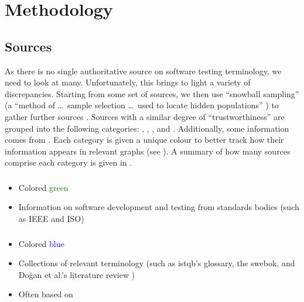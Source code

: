 \section{Methodology}
\label{methodology}

\subsection{Sources}
\label{sources}
As there is no single authoritative source on software testing terminology,
we need to look at many. Unfortunately, this brings to light a variety of
discrepancies. Starting from some set of sources, we then use
``snowball sampling'' (a ``method of \dots\ sample selection \dots\ used to
locate hidden populations'' \citep{Johnson2014}) to gather further sources%
. Sources with a similar degree of
``trustworthiness'' are grouped into the following
categories: \stds{}, \metas{}, \texts{}, and \others{}. \ifnotpaper
    Additionally, some information comes from . \fi Each category is
given a unique colour to better track how their information appears in relevant
graphs (see ). A summary
of how many sources comprise each category is given in .

\subsubsection{}
\label{stds}
\begin{itemize}
    \item Colored \textcolor{green}{green}
    \item Information on software development and testing from
          standards bodies \ifnotpaper\else (such as IEEE and ISO)\fi
\end{itemize}

\subsubsection{}
\label{metas}
\begin{itemize}
    \item Colored \textcolor{blue}{blue}
    \item Collections of relevant terminology (such as \acs{istqb}'s glossary,
          the \acs{swebok}, and \ifnotpaper \citeauthor{DoğanEtAl2014}\else
              Doğan et al.\fi's literature review \citeyearpar{DoğanEtAl2014})
    \item Often based on \stds{}
\end{itemize}

